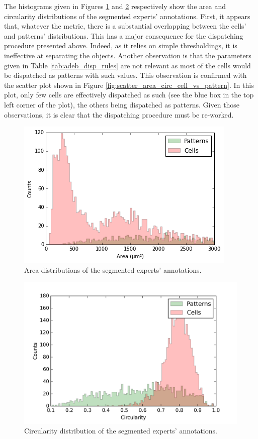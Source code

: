 The histograms given in Figures \ref{fig:hist_area_cell_vs_pattern} and \ref{fig:hist_circ_cell_vs_pattern} respectively show the area and circularity distributions of the segmented experts' annotations. First, it appears that, whatever the metric, there is a substantial overlapping between the cells' and patterns' distributions. This has a major consequence for the dispatching procedure presented above. Indeed, as it relies on simple thresholdings, it is ineffective at separating the objects. Another observation is that the parameters given in Table \ref{tab:adeb_disp_rules} are not relevant as most of the cells would be dispatched as patterns with such values. This observation is confirmed with the scatter plot shown in Figure \ref{fig:scatter_area_circ_cell_vs_pattern}. In this plot, only few cells are effectively dispatched as such (see the blue box in the top left corner of the plot), the others being dispatched as patterns. Given those observations, it is clear that the dispatching procedure must be re-worked.

\begin{figure}
	\center
	\includegraphics[scale=0.75]{image/cells_patterns_real_area_0_5000.png}
	\caption{Area distributions of the segmented experts' annotations.}
	\label{fig:hist_area_cell_vs_pattern}
\end{figure}

\begin{figure}
	\center
	\includegraphics[scale=0.75]{image/cells_patterns_circ.png}
	\caption{Circularity distribution of the segmented experts' annotations.}
	\label{fig:hist_circ_cell_vs_pattern}
\end{figure}



